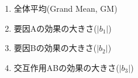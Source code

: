 \begin{enumerate}
	\item 全体平均(Grand Mean, GM)
	\item 要因Aの効果の大きさ($|b_1|$)
	\item 要因Bの効果の大きさ($|b_2|$)
	\item 交互作用ABの効果の大きさ($|b_3|$)
\end{enumerate}

